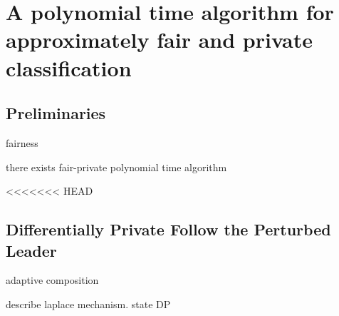
\section{A polynomial time algorithm for approximately fair and private classification}

\subsection{Preliminaries}
\begin{definition}
	fairness
\end{definition}



\begin{theorem}
	there exists fair-private polynomial time algorithm
\end{theorem}

<<<<<<< HEAD
\subsection{Differentially Private Follow the Perturbed Leader}
\begin{theorem}
	adaptive composition
\end{theorem}

\begin{theorem}
	describe laplace mechanism. state DP
\end{theorem}

	
